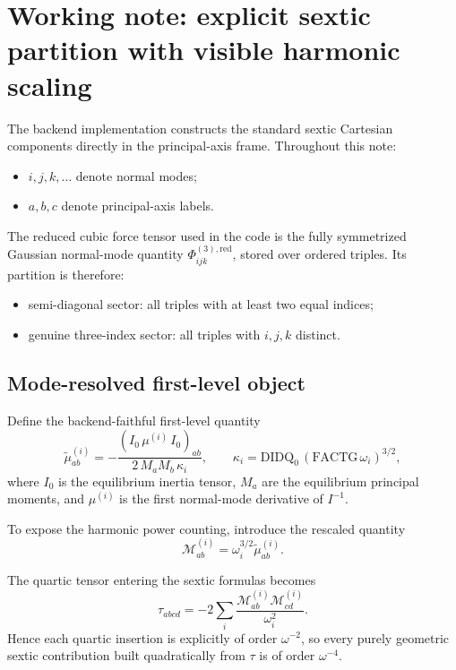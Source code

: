 \section*{Working note: explicit sextic partition with visible harmonic scaling}

The backend implementation constructs the standard sextic Cartesian components
directly in the principal-axis frame. Throughout this note:

\begin{itemize}
\item $i,j,k,\ldots$ denote normal modes;
\item $a,b,c$ denote principal-axis labels.
\end{itemize}

The reduced cubic force tensor used in the code is the fully symmetrized
Gaussian normal-mode quantity $\Phi^{(3),\mathrm{red}}_{ijk}$, stored over
ordered triples. Its partition is therefore:

\begin{itemize}
\item semi-diagonal sector: all triples with at least two equal indices;
\item genuine three-index sector: all triples with $i,j,k$ distinct.
\end{itemize}

\subsection*{Mode-resolved first-level object}

Define the backend-faithful first-level quantity
\begin{equation}
\widetilde{\mu}^{(i)}_{ab}
=
-\frac{(I_0\,\mu^{(i)}\,I_0)_{ab}}
{2\,M_a M_b\,\kappa_i},
\qquad
\kappa_i
=
\mathrm{DIDQ}_0\,(\mathrm{FACTG}\,\omega_i)^{3/2},
\end{equation}
where $I_0$ is the equilibrium inertia tensor, $M_a$ are the equilibrium
principal moments, and $\mu^{(i)}$ is the first normal-mode derivative of
$I^{-1}$.

To expose the harmonic power counting, introduce the rescaled quantity
\begin{equation}
\mathcal{M}^{(i)}_{ab}
=
\omega_i^{3/2}\widetilde{\mu}^{(i)}_{ab}.
\end{equation}

The quartic tensor entering the sextic formulas becomes
\begin{equation}
\tau_{abcd}
=
-2\sum_i
\frac{\mathcal{M}^{(i)}_{ab}\mathcal{M}^{(i)}_{cd}}{\omega_i^2}.
\label{eq:sextic_working_tau_mu1}
\end{equation}
Hence each quartic insertion is explicitly of order $\omega^{-2}$, so every
purely geometric sextic contribution built quadratically from $\tau$ is of
order $\omega^{-4}$.

